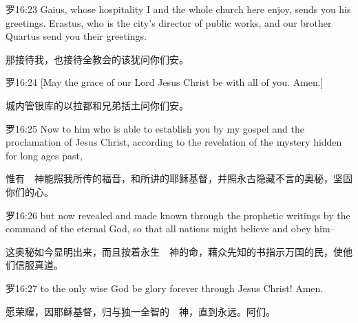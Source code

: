 \documentclass[a4paper,11pt,onecolumn,twoside]{ctexart}
\begin{document}
\begin{multicols}{2}
 罗16:23
 Gaius, whose hospitality I and the whole church here enjoy, sends you his greetings. Erastus, who is the city's director of public works, and our brother Quartus send you their greetings.

 那接待我，也接待全教会的该犹问你们安。


 罗16:24
 [May the grace of our Lord Jesus Christ be with all of you. Amen.]

 城内管银库的以拉都和兄弟括土问你们安。


 罗16:25
 Now to him who is able to establish you by my gospel and the proclamation of Jesus Christ, according to the revelation of the mystery hidden for long ages past,

 惟有　神能照我所传的福音，和所讲的耶稣基督，并照永古隐藏不言的奥秘，坚固你们的心。


 罗16:26
 but now revealed and made known through the prophetic writings by the command of the eternal God, so that all nations might believe and obey him--

 这奥秘如今显明出来，而且按着永生　神的命，藉众先知的书指示万国的民，使他们信服真道。


 罗16:27
 to the only wise God be glory forever through Jesus Christ! Amen.

 愿荣耀，因耶稣基督，归与独一全智的　神，直到永远。阿们。

\end{multicols}
\clearpage
\end{document}
